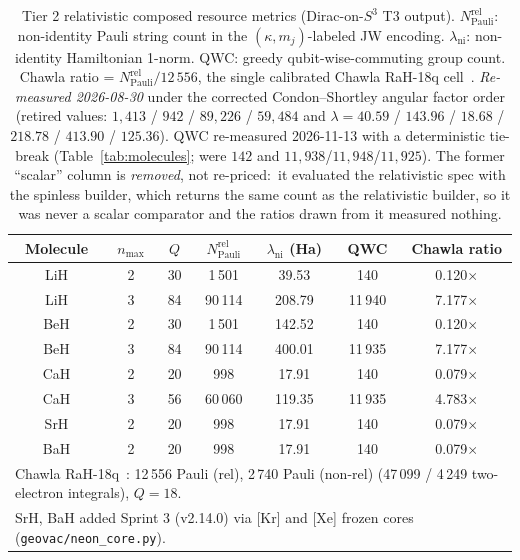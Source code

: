 \documentclass[twocolumn,pra,amsmath,amssymb,superscriptaddress]{revtex4-2}
\newcommand{\gvq}[2]{#2}
\begin{document}
\begin{table}[h]
\caption{Tier 2 relativistic composed resource metrics (Dirac-on-$S^3$
T3 output). $N_{\mathrm{Pauli}}^{\mathrm{rel}}$: non-identity Pauli
string count in the $(\kappa, m_j)$-labeled JW encoding. $\lambda_{\mathrm{ni}}$:
non-identity Hamiltonian 1-norm. QWC: greedy qubit-wise-commuting
group count. Chawla ratio = $N_{\mathrm{Pauli}}^{\mathrm{rel}} / \gvq{chawla_rah}{12\,556}$,
the single calibrated Chawla RaH-18q cell~\cite{Chawla2024}.
\emph{Re-measured 2026-08-30} under the corrected Condon--Shortley angular
factor order (retired values: $1{,}413$ / $942$ / $89{,}226$ / $59{,}484$
and $\lambda = 40.59$ / $143.96$ / $18.68$ / $218.78$ / $413.90$ /
$125.36$).  QWC re-measured 2026-11-13 with a deterministic tie-break
(Table~\ref{tab:molecules}; were $142$ and $11{,}938$/$11{,}948$/$11{,}925$).
The former ``scalar'' column is \emph{removed}, not re-priced:\
it evaluated the relativistic spec with the spinless builder, which returns
the same count as the relativistic builder, so it was never a scalar
comparator and the ratios drawn from it measured nothing.}
\label{tab:paper20_tier2}
\begin{ruledtabular}
\begin{tabular}{ccccccc}
Molecule & $n_{\max}$ & $Q$ & $N_{\mathrm{Pauli}}^{\mathrm{rel}}$ & $\lambda_{\mathrm{ni}}$ (Ha) & QWC & Chawla ratio \\
\hline
LiH & 2 & 30 &  1\,501 &  39.53 &     140 & 0.120$\times$ \\
LiH & 3 & 84 & 90\,114 & 208.79 & 11\,940 & 7.177$\times$ \\
BeH & 2 & 30 &  1\,501 & 142.52 &     140 & 0.120$\times$ \\
BeH & 3 & 84 & 90\,114 & 400.01 & 11\,935 & 7.177$\times$ \\
CaH & 2 & 20 &     998 &  17.91 &     140 & 0.079$\times$ \\
CaH & 3 & 56 & 60\,060 & 119.35 & 11\,935 & 4.783$\times$ \\
SrH & 2 & 20 &     998 &  17.91 &     140 & 0.079$\times$ \\
BaH & 2 & 20 &     998 &  17.91 &     140 & 0.079$\times$ \\
\hline\hline
\multicolumn{7}{l}{\footnotesize Chawla RaH-18q~\cite{Chawla2024}: 12\,556 Pauli (rel), 2\,740 Pauli (non-rel) (47\,099 / 4\,249 two-electron integrals), $Q = 18$.} \\
\multicolumn{7}{l}{\footnotesize SrH, BaH added Sprint 3 (v2.14.0) via [Kr] and [Xe] frozen cores (\texttt{geovac/neon\_core.py}).} \\

\end{tabular}
\end{ruledtabular}
\end{table}
\end{document}
